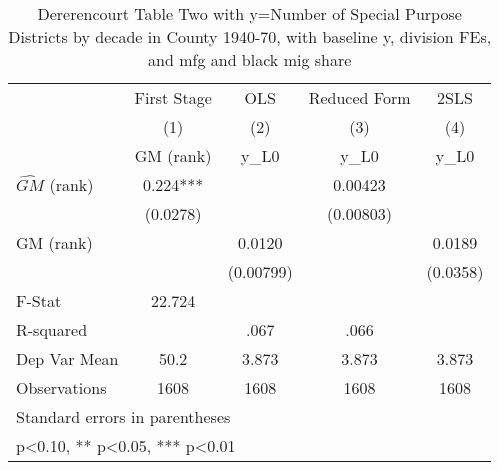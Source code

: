 \begin{table}[htbp]\centering
\def\sym#1{\ifmmode^{#1}\else\(^{#1}\)\fi}
\caption{Dererencourt Table Two with y=Number of Special Purpose Districts by decade in County 1940-70, with baseline y, division FEs, and mfg and black mig share}
\begin{tabular}{l*{4}{c}}
\toprule
                    & First Stage   &         OLS   &Reduced Form   &        2SLS   \\
                    &\multicolumn{1}{c}{(1)}&\multicolumn{1}{c}{(2)}&\multicolumn{1}{c}{(3)}&\multicolumn{1}{c}{(4)}\\
                    &\multicolumn{1}{c}{GM  (rank)}&\multicolumn{1}{c}{y\_L0}&\multicolumn{1}{c}{y\_L0}&\multicolumn{1}{c}{y\_L0}\\
\midrule
$\hat{GM}$ (rank)   &       0.224***&               &     0.00423   &               \\
                    &    (0.0278)   &               &   (0.00803)   &               \\
\addlinespace
GM  (rank)          &               &      0.0120   &               &      0.0189   \\
                    &               &   (0.00799)   &               &    (0.0358)   \\
\midrule
F-Stat              &      22.724   &               &               &               \\
R-squared           &               &        .067   &        .066   &               \\
Dep Var Mean        &        50.2   &       3.873   &       3.873   &       3.873   \\
Observations        &        1608   &        1608   &        1608   &        1608   \\
\bottomrule
\multicolumn{5}{l}{\footnotesize Standard errors in parentheses}\\
\multicolumn{5}{l}{\footnotesize * p<0.10, ** p<0.05, *** p<0.01}\\
\end{tabular}
\end{table}
